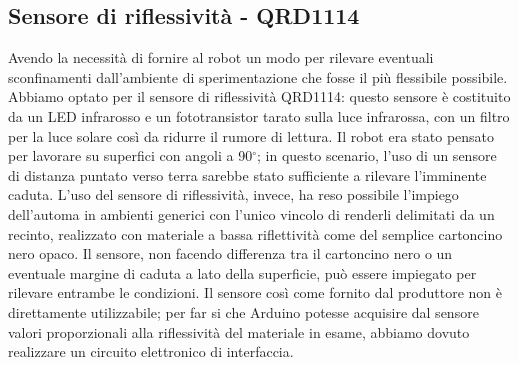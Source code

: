 \subsection{Sensore di riflessività - QRD1114}
Avendo la necessità di fornire al robot un modo per rilevare eventuali 
sconfinamenti dall'ambiente di sperimentazione che fosse il più flessibile possibile. 
Abbiamo optato per il sensore di riflessività QRD1114: questo sensore è costituito da un LED infrarosso e un 
fototransistor tarato sulla luce infrarossa, con un filtro per la luce solare 
così da ridurre il rumore di lettura. Il robot era stato pensato per lavorare 
su superfici con angoli a 90$^\circ$; in questo scenario, l'uso di un sensore 
di distanza puntato verso terra sarebbe stato sufficiente a rilevare l'imminente caduta. 
L'uso del sensore di riflessività, invece, ha reso possibile l'impiego dell'automa in ambienti 
generici con l'unico vincolo di renderli delimitati da un recinto, 
realizzato con materiale a bassa riflettività come del semplice cartoncino nero opaco.
Il sensore, non facendo differenza tra il cartoncino nero o un eventuale margine 
di caduta a lato della superficie, può essere impiegato per rilevare entrambe le condizioni.
Il sensore così come fornito dal produttore non è direttamente 
utilizzabile; per far si che Arduino potesse acquisire dal sensore valori 
proporzionali alla riflessività del materiale in esame, abbiamo dovuto 
realizzare un circuito elettronico di interfaccia. 

